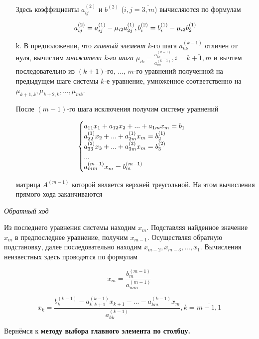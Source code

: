 \documentclass[__main__.tex]{subfiles}
\begin{document}
\begin{enumerate}
	Здесь коэффициенты $a^{(2)}_{i j}$ и $b^{(2)}$ ($i, j = \overline{3,m}$) вычисляются по формулам
	
	\begin{gather*}
		\llabel{1_5}
		a^{(2)}_{i j} = a_{i j}^{(1)} - \mu_{i 2} a_{2 j}^{(1)}, b_i^{(2)} = b_i^{(1)} - \mu_{i 2} b_2^{(1)}
	\end{gather*}
	
	\item[k.]
	В предположении, что \textit{главный элемент} $k$-го шага $a^{(k-1)}_{k k}$ отличен от нуля, вычислим \textit{множители k-го шага} $\mu_{i k} = \frac{a_{i k}^{(k-1)}}{a_{k k}^(k-1)}, i = \overline{k+1,m}$ и вычтем последовательно из $(k+1)$-го, ..., $m$-го уравнений полученной на предыдущем шаге системы $k$-е уравнение, умноженное соответственно на $\mu_{k+1, k}, \mu_{k+2, k}, ..., \mu_{m k}$.
	
	После $(m-1)$-го шага исключения получим систему уравнений 
	
	\begin{gather}
		\llabel{1_6}
		\begin{cases}
			a_{1 1} x_1 + a_{1 2} x_2 + ... + a_{1 m} x_m = b_1 \\
			a_{2 2}^{(1)} x_2 + ... + a_{2 m}^{(1)} x_m = b_2^{(1)} \\
			a^{(2)}_{3 3} x_3 + ... + a^{(2)}_{3 m} x_m = b_3^{(2)} \\
			... \\
			a^{(m-1)}_{m m} x_m = b_m^{(m-1)}
		\end{cases}
	\end{gather}
	
	матрица $A^{(m-1)}$ которой является верхней треугольной. На этом вычисления прямого хода заканчиваются
\end{enumerate}

\textit{Обратный ход}

Из последнего уравнения системы  находим $x_m$. Подставляя найденное значение $x_m$ в предпоследнее уравнение, получим $x_{m-1}$. Осуществляя обратную подстановку, далее последовательно находим $x_{m-2}, x_{m-3}, ..., x_1$. Вычисления неизвестных здесь проводятся по формулам

$$x_m = \frac{b_m^{(m-1)}}{a^{(m-1)}_{m m}}$$

$$x_k = \frac{b_k^{(k-1)} - a^{(k-1)}_{k, k + 1} x_{k + 1} - ... - a_{k m}^{(k-1)} x_m}{a_{k k}^{(k-1)}}, k = \overline{m-1, 1}$$

Вернёмся к \textbf{методу выбора главного элемента по столбцу.}
\end{document}
